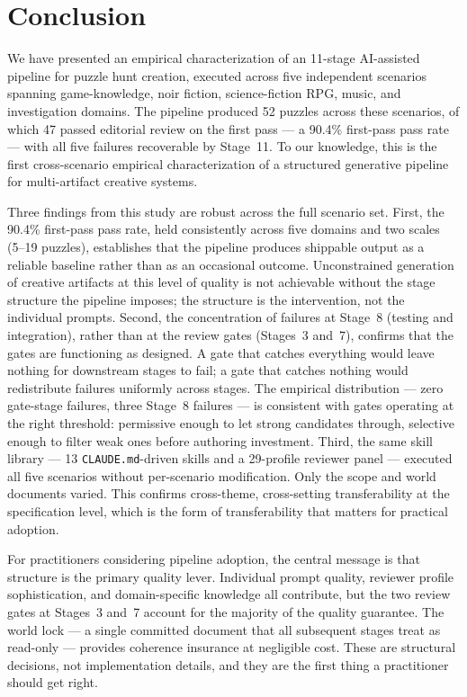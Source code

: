 \section{Conclusion}

We have presented an empirical characterization of an 11-stage AI-assisted pipeline for puzzle hunt creation, executed across five independent scenarios spanning game-knowledge, noir fiction, science-fiction RPG, music, and investigation domains. The pipeline produced 52 puzzles across these scenarios, of which 47 passed editorial review on the first pass — a 90.4\% first-pass pass rate — with all five failures recoverable by Stage~11. To our knowledge, this is the first cross-scenario empirical characterization of a structured generative pipeline for multi-artifact creative systems.

Three findings from this study are robust across the full scenario set. First, the 90.4\% first-pass pass rate, held consistently across five domains and two scales (5--19 puzzles), establishes that the pipeline produces shippable output as a reliable baseline rather than as an occasional outcome. Unconstrained generation of creative artifacts at this level of quality is not achievable without the stage structure the pipeline imposes; the structure is the intervention, not the individual prompts. Second, the concentration of failures at Stage~8 (testing and integration), rather than at the review gates (Stages~3 and~7), confirms that the gates are functioning as designed. A gate that catches everything would leave nothing for downstream stages to fail; a gate that catches nothing would redistribute failures uniformly across stages. The empirical distribution — zero gate-stage failures, three Stage~8 failures — is consistent with gates operating at the right threshold: permissive enough to let strong candidates through, selective enough to filter weak ones before authoring investment. Third, the same skill library — 13 \texttt{CLAUDE.md}-driven skills and a 29-profile reviewer panel — executed all five scenarios without per-scenario modification. Only the scope and world documents varied. This confirms cross-theme, cross-setting transferability at the specification level, which is the form of transferability that matters for practical adoption.

For practitioners considering pipeline adoption, the central message is that structure is the primary quality lever. Individual prompt quality, reviewer profile sophistication, and domain-specific knowledge all contribute, but the two review gates at Stages~3 and~7 account for the majority of the quality guarantee. The world lock — a single committed document that all subsequent stages treat as read-only — provides coherence insurance at negligible cost. These are structural decisions, not implementation details, and they are the first thing a practitioner should get right.

